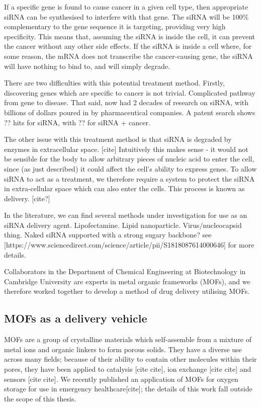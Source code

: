 If a specific gene is found to cause cancer in a given cell type, then appropriate siRNA can be synthesised to interfere with that gene. 
The siRNA will be 100\% complementary to the gene sequence it is targeting, providing very high specificity. 
This means that, assuming the siRNA is inside the cell, it can prevent the cancer without any other side effects. 
If the siRNA is inside a cell where, for some reason, the mRNA does not transcribe the cancer-causing gene, the siRNA will have nothing to bind to, and will simply degrade. 

There are two difficulties with this potential treatment method. 
Firstly, discovering genes which are specific to cancer is not trivial. 
Complicated pathway from gene to disease. 
That said, now had 2 decades of research on siRNA, with billions of dollars poured in by pharmaceutical companies. 
A patent search shows ?? hits for siRNA, with ?? for siRNA + cancer. 

The other issue with this treatment method is that siRNA is degraded by enzymes in extracellular space. [cite]
Intuitively this makes sense - it would not be sensible for the body to allow arbitrary pieces of nucleic acid to enter the cell, since (as just described) it could affect the cell's ability to express genes. 
To allow siRNA to act as a treatment, we therefore require a system to protect the siRNA in extra-cellular space which can also enter the cells. 
This process is known as delivery. [cite?]

In the literature, we can find several methods under investigation for use as an siRNA delivery agent.
Lipofectamine. 
Lipid nanoparticle.
Virus/nucleocapsid thing. 
Naked siRNA supported with a strong sugary backbone?
see [https://www.sciencedirect.com/science/article/pii/S1818087614000646] for more details. 

Collaborators in the Department of Chemical Engineering at Biotechnology in Cambridge University are experts in metal organic frameworks (MOFs), and we therefore worked together to develop a method of drug delivery utilising MOFs.


\subsection{MOFs as a delivery vehicle}
MOFs are a group of crystalline materials which self-assemble from a mixture of metal ions and organic linkers to form porous solids. 
They have a diverse use across many fields; because of their ability to contain other molecules within their pores, they have been applied to catalysis [cite cite], ion exchange [cite cite] and sensors [cite cite]. 
We recently published an application of MOFs for oxygen storage for use in emergency healthcare[cite]; the details of this work fall outside the scope of this thesis. 

